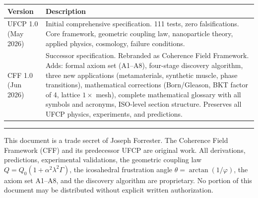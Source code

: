 \documentclass[11pt, a4paper]{article}
\begin{document}
\begin{center}
\begin{tabular}{@{}lp{10.5cm}@{}}
\toprule
\textbf{Version} & \textbf{Description} \\
\midrule
UFCP 1.0 (May 2026) & Initial comprehensive specification.
  111 tests, zero falsifications. Core framework, geometric
  coupling law, nanoparticle theory, applied physics, cosmology,
  failure conditions. \\
CFF 1.0 (Jun 2026) & Successor specification. Rebranded as
  Coherence Field Framework. Adds: formal axiom set (A1--A8),
  four-stage discovery algorithm, three new applications
  (metamaterials, synthetic muscle, phase transitions),
  mathematical corrections (Born/Gleason, BKT factor of 4,
  lattice $1\times$ mesh), complete mathematical glossary with
  all symbols and acronyms, ISO-level section structure.
  Preserves all UFCP physics, experiments, and predictions. \\
\bottomrule
\end{tabular}
\end{center}

\vspace{2em}
\hrule
\vspace{0.5em}
{\color{nm-gray}\small This document is a trade secret of
Joseph Forrester. The Coherence Field Framework (CFF) and its
predecessor UFCP are original work. All derivations, predictions,
experimental validations, the geometric coupling law
$Q = Q_0(1 + \alpha^2\lambda^2\Gamma)$, the icosahedral
frustration angle $\theta = \arctan(1/\varphi)$, the axiom set
A1--A8, and the discovery algorithm are proprietary. No portion
of this document may be distributed without explicit written
authorization.}
\end{document}
